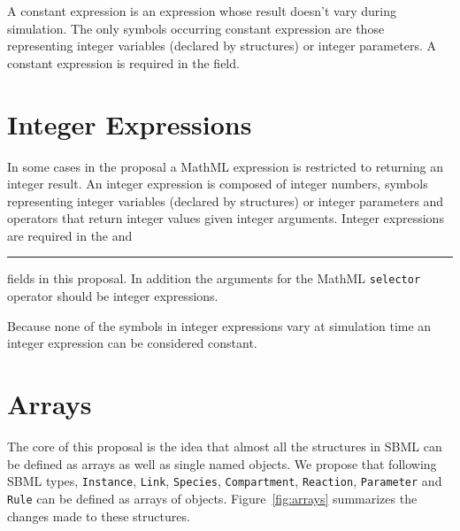 \documentclass{cekarticle}
\begin{document}
A constant expression is an expression whose result doesn't vary during simulation.
The only symbols occurring constant expression are those representing integer variables (declared by  structures)
or integer parameters.  A constant expression is required in the  field.

\section{Integer Expressions}

In some cases in the proposal a MathML expression is restricted to returning an integer result.
An integer expression is composed of integer numbers, symbols representing integer variables (declared by  structures)
or integer parameters and
operators that return integer values given integer arguments.  Integer expressions are required in the
 and \rule{0.5in}{0.5pt} fields in this proposal. In addition the arguments for the
MathML \texttt{selector} operator should be integer expressions.

Because none of the symbols in integer expressions vary at simulation time an integer expression can be considered constant.

\section{Arrays}
\label{sec:arrays}

The core of this proposal is the idea that almost all the
structures in SBML can be defined as arrays as well as single
named objects.  We propose that following SBML types,
\texttt{Instance}, \texttt{Link}, \texttt{Species}, \texttt{Compartment}, \texttt{Reaction},
\texttt{Parameter} and \texttt{Rule} can be defined as arrays of
objects.  Figure~\ref{fig:arrays} summarizes the changes made
to these structures.
\end{document}
